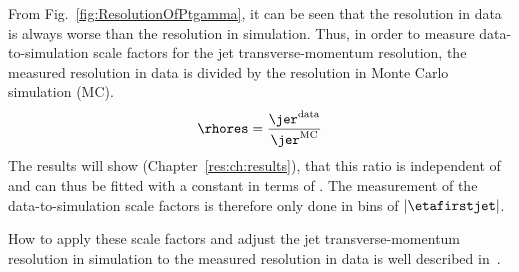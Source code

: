 From Fig.~\ref{fig:ResolutionOfPtgamma}, it can be seen that the resolution in data is always worse than the resolution in simulation.
Thus, in order to measure data-to-simulation scale factors \rhores for the jet transverse-momentum resolution, the measured resolution in data is divided by the resolution in Monte Carlo simulation (MC).
\begin{equation}
\label{res:eq:rhores}
\rhores = \frac{\jer^{\text{data}}}{\jer^{\text{MC}}}
\end{equation}
The results will show (Chapter~\ref{res:ch:results}), that this ratio is independent of \ptgamma and can thus be fitted with a constant in terms of \ptgamma.
The measurement of the data-to-simulation scale factors is therefore only done in bins of $|\etafirstjet|$.

How to apply these scale factors and adjust the jet transverse-momentum resolution in simulation to the measured resolution in data is well described in~\cite{bib:Matthias_Thesis}.





\FloatBarrier
